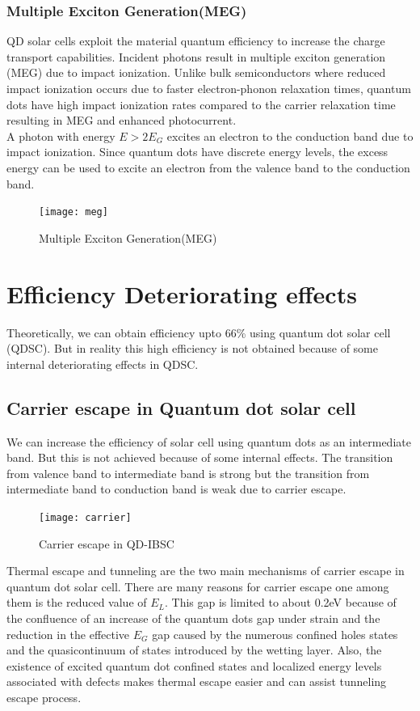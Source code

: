 \documentclass[hidelinks, 12pt]{report}
\begin{document}
\subsection{Multiple Exciton Generation(MEG)}
QD solar cells exploit the material quantum efficiency to increase the charge transport capabilities. Incident photons result in multiple exciton generation (MEG) due to impact ionization.
Unlike bulk semiconductors where reduced impact ionization occurs due to faster electron-phonon relaxation times, quantum dots have high impact ionization rates compared to the carrier relaxation time resulting in MEG and enhanced photocurrent.\\
A photon with energy $E>2E_{G}$ excites an electron to the conduction band due to impact ionization. Since quantum dots have discrete energy levels, the excess energy can be used to excite an electron from the valence band to the conduction band.\\ 
\begin{figure}[H]
\centering
\texttt{[image: meg]}
\caption[Multiple Exciton Generation(MEG)]{Multiple Exciton Generation(MEG)\cite{meg}}
\label{Tuned bandgap Quantum dot Solar cell}
\end{figure}
\pagebreak
\chapter{Efficiency Deteriorating effects}
Theoretically, we can obtain efficiency upto 66\% using quantum dot solar cell (QDSC). But in reality this high efficiency is not obtained because of some internal deteriorating effects in QDSC.    
\section{Carrier escape in Quantum dot solar cell}
We can increase the efficiency of solar cell using quantum dots as an intermediate band. But this is not achieved because of some internal effects. The transition from valence band to intermediate band is strong but the transition from intermediate band to conduction band is weak due to carrier escape. \\

\begin{figure}[H]
\centering
\texttt{[image: carrier]}
\caption[Carrier escape in QD-IBSC]{Carrier escape in QD-IBSC \cite{effect}}
\label{Carrier escape}
\end{figure}

Thermal escape and tunneling are the two main mechanisms of carrier escape in quantum dot solar cell.
There are many reasons for carrier escape one among them is the reduced value of $E_{L}$. This gap is limited to about 0.2eV because of the confluence of an increase of the quantum dots gap under strain and the reduction in the effective $E_{G}$ gap caused by the numerous confined holes states and the quasicontinuum of states introduced by the wetting layer. Also, the existence of excited quantum dot confined states and localized energy levels associated with defects makes thermal escape easier and can assist tunneling escape process.\\
\end{document}
